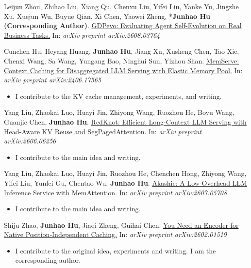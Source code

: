 \begin{enumerate}[label={[\arabic*]}]

    \item Leijun Zhou, Zhihao Liu, Xiang Qu, Chenxu Liu, Yifei Liu, Yanke Yu, Jingzhe Xu, Xuejun Wu, Buyue Qian, Xi Chen, Yaowei Zheng, *\textbf{Junhao Hu (Corresponding Author)}. \href{https://arxiv.org/abs/2608.03764}{\color{cyan} GDPevo: Evaluating Agent Self-Evolution on Real Business Tasks.} In: \textit{arXiv preprint arXiv:2608.03764}

    \item Cunchen Hu, Heyang Huang, \textbf{Junhao Hu}, Jiang Xu, Xusheng Chen, Tao Xie, Chenxi Wang, Sa Wang, Yungang Bao, Ninghui Sun, Yizhou Shan. \href{https://arxiv.org/abs/2406.17565}{\color{cyan} MemServe: Context Caching for Disaggregated LLM Serving with Elastic Memory Pool.} In: \textit{arXiv preprint arXiv:2406.17565}
    \begin{itemize}
        \item I contribute to the KV cache management, experiments, and writing.
    \end{itemize}

    \item Yang Liu, Zhaokai Luo, Huayi Jin, Zhiyong Wang, Ruozhou He, Boyu Wang, Guanjie Chen, \textbf{Junhao Hu}. \href{https://arxiv.org/abs/2606.06256}{\color{cyan} RedKnot: Efficient Long-Context LLM Serving with Head-Aware KV Reuse and SegPagedAttention.} In: \textit{arXiv preprint arXiv:2606.06256}
    \begin{itemize}
        \item I contribute to the main idea and writing.
    \end{itemize}

    \item Yang Liu, Zhaokai Luo, Huayi Jin, Ruozhou He, Chenchen Hong, Zhiyong Wang, Yifei Liu, Yunfei Gu, Chentao Wu, \textbf{Junhao Hu}. \href{https://arxiv.org/abs/2607.05708}{\color{cyan} Akashic: A Low-Overhead LLM Inference Service with MemAttention.} In: \textit{arXiv preprint arXiv:2607.05708}
    \begin{itemize}
        \item I contribute to the main idea and writing.
    \end{itemize}

    \item Shiju Zhao, \textbf{Junhao Hu}, Jiaqi Zheng, Guihai Chen. \href{https://arxiv.org/abs/2602.01519}{\color{cyan} You Need an Encoder for Native Position-Independent Caching.} In: \textit{arXiv preprint arXiv:2602.01519}
    \begin{itemize}
        \item I contribute to the original idea, experiments and writing. I am the corresponding author.
    \end{itemize}


\end{enumerate}
